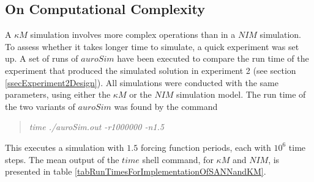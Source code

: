 % 



	\subsection{On Computational Complexity}
	\label{ssecOnComputationalComlexity}
		A $\kappa M$ simulation involves more complex operations than in a $NIM$ simulation.
		To assess whether it takes longer time to simulate, a quick experiment was set up. 
		A set of runs of $auroSim$ have been executed to compare the run time of the experiment that produced the simulated solution in experiment 2 (see section \ref{ssecExperiment2Design}).
		All simulations were conducted with the same parameters, using either the $\kappa M$ or the $NIM$ simulation model.
		The run time of the two variants of $auroSim$ was found by the command
\begin{quote}
	\emph{time ./auroSim.out -r1000000 -n1.5}
\end{quote}
		This executes a simulation with $1.5$ forcing function periods, each with $10^6$ time steps.
		The mean output of the $time$ shell command, for $\kappa M$ and $NIM$, is presented in table \ref{tabRunTimesForImplementationOfSANNandKM}.

